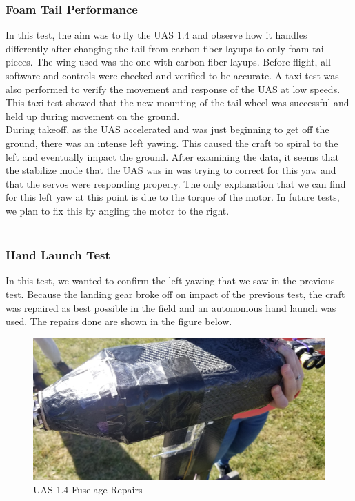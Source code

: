 \documentclass{article}
\begin{document}
\subsubsection*{Foam Tail Performance}
In this test, the aim was to fly the UAS 1.4 and observe how it handles differently after changing the tail from carbon fiber layups to only foam tail pieces. The wing used was the one with carbon fiber layups. Before flight, all software and controls were checked and verified to be accurate. A taxi test was also performed to verify the movement and response of the UAS at low speeds. This taxi test showed that the new mounting of the tail wheel was successful and held up during movement on the ground. \\
During takeoff, as the UAS accelerated and was just beginning to get off the ground, there was an intense left yawing. This caused the craft to spiral to the left and eventually impact the ground. After examining the data, it seems that the stabilize mode that the UAS was in was trying to correct for this yaw and that the servos were responding properly. The only explanation that we can find for this left yaw at this point is due to the torque of the motor. In future tests, we plan to fix this by angling the motor to the right. \\ \\

\subsubsection*{Hand Launch Test}
In this test, we wanted to confirm the left yawing that we saw in the previous test. Because the landing gear broke off on impact of the previous test, the craft was repaired as best possible in the field and an autonomous hand launch was used. The repairs done are shown in the figure below.
\begin{figure}[H]
\includegraphics[width = \columnwidth]{UAS1_4_RepairsB.jpg}
\caption{UAS 1.4 Fuselage Repairs}
\end{figure}
\end{document}
